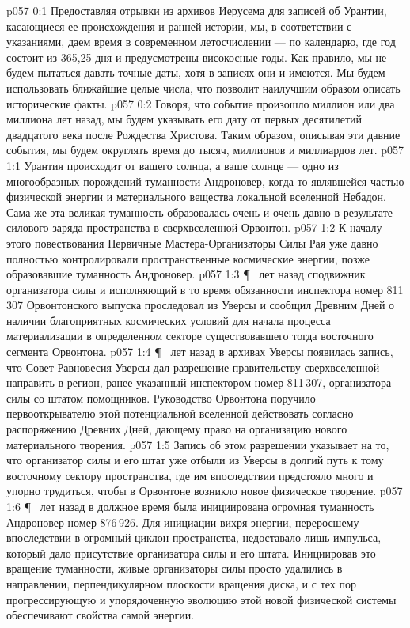 \vs p057 0:1 Предоставляя отрывки из архивов Иерусема для записей об Урантии, касающиеся ее происхождения и ранней истории, мы, в соответствии с указаниями, даем время в современном летосчислении --- по календарю, где год состоит из 365,25 дня и предусмотрены високосные годы. Как правило, мы не будем пытаться давать точные даты, хотя в записях они и имеются. Мы будем использовать ближайшие целые числа, что позволит наилучшим образом описать исторические факты.
\vs p057 0:2 Говоря, что событие произошло миллион или два миллиона лет назад, мы будем указывать его дату от первых десятилетий двадцатого века после Рождества Христова. Таким образом, описывая эти давние события, мы будем округлять время до тысяч, миллионов и миллиардов лет.
\vs p057 1:1 Урантия происходит от вашего солнца, а ваше солнце --- одно из многообразных порождений туманности Андроновер, когда\hyp{}то являвшейся частью физической энергии и материального вещества локальной вселенной Небадон. Сама же эта великая туманность образовалась очень и очень давно в результате силового заряда пространства в сверхвселенной Орвонтон.
\vs p057 1:2 К началу этого повествования Первичные Мастера\hyp{}Организаторы Силы Рая уже давно полностью контролировали пространственные космические энергии, позже образовавшие туманность Андроновер.
\vs p057 1:3 \P\  лет назад сподвижник организатора силы и исполняющий в то время обязанности инспектора номер 811\,307 Орвонтонского выпуска проследовал из Уверсы и сообщил Древним Дней о наличии благоприятных космических условий для начала процесса материализации в определенном секторе существовавшего тогда восточного сегмента Орвонтона.
\vs p057 1:4 \P\  лет назад в архивах Уверсы появилась запись, что Совет Равновесия Уверсы дал разрешение правительству сверхвселенной направить в регион, ранее указанный инспектором номер 811\,307, организатора силы со штатом помощников. Руководство Орвонтона поручило первооткрывателю этой потенциальной вселенной действовать согласно распоряжению Древних Дней, дающему право на организацию нового материального творения.
\vs p057 1:5 Запись об этом разрешении указывает на то, что организатор силы и его штат уже отбыли из Уверсы в долгий путь к тому восточному сектору пространства, где им впоследствии предстояло много и упорно трудиться, чтобы в Орвонтоне возникло новое физическое творение.
\vs p057 1:6 \P\  лет назад в должное время была инициирована огромная туманность Андроновер номер 876\,926. Для инициации вихря энергии, переросшему впоследствии в огромный циклон пространства, недоставало лишь импульса, который дало присутствие организатора силы и его штата. Инициировав это вращение туманности, живые организаторы силы просто удалились в направлении, перпендикулярном плоскости вращения диска, и с тех пор прогрессирующую и упорядоченную эволюцию этой новой физической системы обеспечивают свойства самой энергии.
